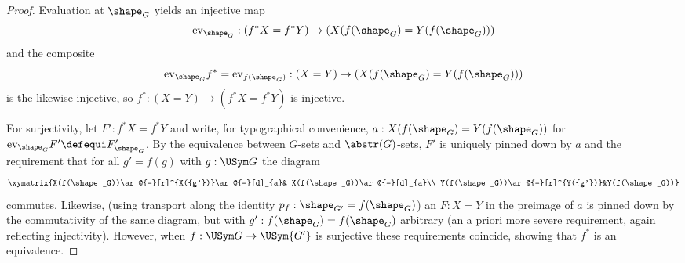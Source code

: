 \begin{proof}
  Evaluation at $\shape_G$  yields an injective map
$$\mathrm{ev}_{\shape_G}:(f^*X=f^*Y)\to(X(f(\shape_G)=Y(f(\shape_G)))$$ and the composite
$$\mathrm{ev}_{\shape_G}f^*=\mathrm{ev}_{f(\shape_G)}:(X=Y)\to(X(f(\shape_G)=Y(f(\shape_G)))$$
 is the likewise injective, so $f^*:(X=Y)\to(f^*X=f^*Y)$ is injective.

For surjectivity, let $F':f^*X=f^*Y$ and write, for typographical convenience, $a:X(f(\shape_G)=Y(f(\shape_G))$ for $\mathrm{ev}_{\shape_G}F'\defequi F'_{\shape_G}$.
By the equivalence between $G$-sets and $\abstr(G)$-sets, $F'$ is uniquely pinned down by $a$ and the requirement that for all $g'=f(g)$ with $g:\USym G$ the diagram
$$\xymatrix{X(f(\shape_G))\ar@{=}[r]^{X({g'})}\ar@{=}[d]_{a}&
  X(f(\shape_G))\ar@{=}[d]_{a}\\
  Y(f(\shape_G))\ar@{=}[r]^{Y({g'})}&Y(f(\shape_G))}
$$
commutes.  Likewise, (using transport along the identity $p_f:\shape_{G'}=f(\shape_G)$) an $F:X=Y$ in the preimage of $a$ is pinned down by the commutativity of the same diagram, but with $g':f(\shape_G)=f(\shape_G)$ arbitrary (an a priori more severe requirement, again reflecting injectivity).   However, when $f:\USym G\to\USym {G'}$ is surjective these requirements coincide, showing that $f^*$ is an equivalence.





\end{proof}

